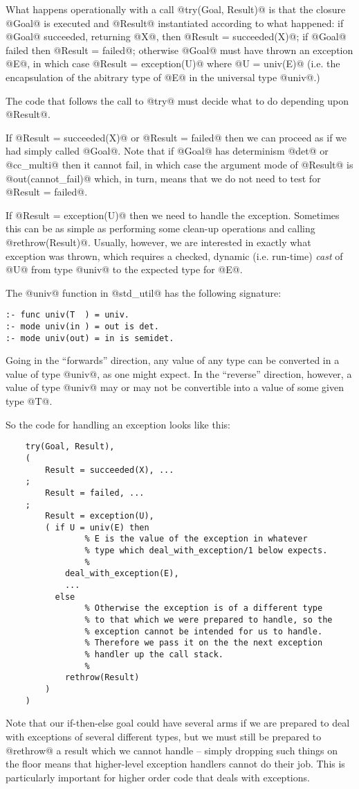 What happens operationally with a call @try(Goal, Result)@ is that the
closure @Goal@ is executed and @Result@ instantiated according to what
happened:
if @Goal@ succeeded, returning @X@, then @Result = succeeded(X)@;
if @Goal@ failed then @Result = failed@;
otherwise @Goal@ must have thrown an exception @E@, in which case
@Result = exception(U)@ where @U = univ(E)@ (i.e. the encapsulation of
the abitrary type of @E@ in the universal type @univ@.)

The code that follows the call to @try@ must decide what to do depending
upon @Result@.

If @Result = succeeded(X)@ or @Result = failed@ then we can proceed as
if we had simply called @Goal@.  Note that if @Goal@ has determinism
@det@ or @cc_multi@ then it cannot fail, in which case the argument mode
of @Result@ is @out(cannot_fail)@ which, in turn, means that we do not
need to test for @Result = failed@.

If @Result = exception(U)@ then we need to handle the exception.
Sometimes this can be as simple as performing some clean-up operations
and calling @rethrow(Result)@.  Usually, however, we are interested in
exactly what exception was thrown, which requires a checked, dynamic
(i.e.  run-time) \emph{cast} of @U@ from type @univ@ to the expected
type for @E@.

The @univ@ function in @std_util@ has the following signature:
\begin{verbatim}
:- func univ(T  ) = univ.
:- mode univ(in ) = out is det.
:- mode univ(out) = in is semidet.
\end{verbatim}
Going in the ``forwards'' direction, any value of any type can be
converted in a value of type @univ@, as one might expect.  In the
``reverse'' direction, however, a value of type @univ@ may or may not be
convertible into a value of some given type @T@.

So the code for handling an exception looks like this:
\begin{verbatim}
    try(Goal, Result),
    (
        Result = succeeded(X), ...
    ;
        Result = failed, ...
    ;
        Result = exception(U),
        ( if U = univ(E) then
                % E is the value of the exception in whatever
                % type which deal_with_exception/1 below expects.
                %
            deal_with_exception(E),
            ...
          else
                % Otherwise the exception is of a different type
                % to that which we were prepared to handle, so the
                % exception cannot be intended for us to handle.
                % Therefore we pass it on the the next exception
                % handler up the call stack.
                %
            rethrow(Result)
        )
    )
\end{verbatim}
Note that our if-then-else goal could have several arms if we are
prepared to deal with exceptions of several different types, but we must
still be prepared to @rethrow@ a result which we cannot handle -- simply
dropping such things on the floor means that higher-level exception
handlers cannot do their job.  This is particularly important for
higher order code that deals with exceptions.

